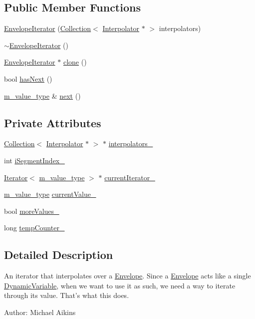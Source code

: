 \subsection*{Public Member Functions}
\begin{CompactItemize}
\item 
\hyperlink{classEnvelopeIterator_a0}{Envelope\-Iterator} (\hyperlink{classCollection}{Collection}$<$ \hyperlink{classInterpolator}{Interpolator} $\ast$ $>$ interpolators)
\item 
\hyperlink{classEnvelopeIterator_a1}{$\sim$Envelope\-Iterator} ()
\item 
\hyperlink{classEnvelopeIterator}{Envelope\-Iterator} $\ast$ \hyperlink{classEnvelopeIterator_a2}{clone} ()
\item 
bool \hyperlink{classEnvelopeIterator_a3}{has\-Next} ()
\item 
\hyperlink{Types_8h_a3}{m\_\-value\_\-type} \& \hyperlink{classEnvelopeIterator_a4}{next} ()
\end{CompactItemize}
\subsection*{Private Attributes}
\begin{CompactItemize}
\item 
\hyperlink{classCollection}{Collection}$<$ \hyperlink{classInterpolator}{Interpolator} $\ast$ $>$ $\ast$ \hyperlink{classEnvelopeIterator_r0}{interpolators\_\-}
\item 
int \hyperlink{classEnvelopeIterator_r1}{i\-Segment\-Index\_\-}
\item 
\hyperlink{classIterator}{Iterator}$<$ \hyperlink{Types_8h_a3}{m\_\-value\_\-type} $>$ $\ast$ \hyperlink{classEnvelopeIterator_r2}{current\-Iterator\_\-}
\item 
\hyperlink{Types_8h_a3}{m\_\-value\_\-type} \hyperlink{classEnvelopeIterator_r3}{current\-Value\_\-}
\item 
bool \hyperlink{classEnvelopeIterator_r4}{more\-Values\_\-}
\item 
long \hyperlink{classEnvelopeIterator_r5}{temp\-Counter\_\-}
\end{CompactItemize}


\subsection{Detailed Description}
An iterator that interpolates over a \hyperlink{classEnvelope}{Envelope}. Since a \hyperlink{classEnvelope}{Envelope} acts like a single \hyperlink{classDynamicVariable}{Dynamic\-Variable}, when we want to use it as such, we need a way to iterate through its value. That's what this does. \begin{Desc}
\item[Author:]Michael Aikins \end{Desc}




